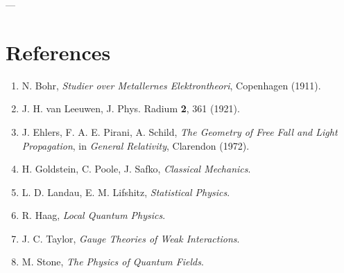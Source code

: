 \documentclass[11pt]{article}
\begin{document}
---

\section*{References}

\begin{enumerate}
\item N. Bohr, \emph{Studier over Metallernes Elektrontheori}, Copenhagen (1911).
\item J. H. van Leeuwen, J. Phys. Radium \textbf{2}, 361 (1921).
\item J. Ehlers, F. A. E. Pirani, A. Schild, \emph{The Geometry of Free Fall and Light Propagation}, in \emph{General Relativity}, Clarendon (1972).
\item H. Goldstein, C. Poole, J. Safko, \emph{Classical Mechanics}.
\item L. D. Landau, E. M. Lifshitz, \emph{Statistical Physics}.
\item R. Haag, \emph{Local Quantum Physics}.
\item J. C. Taylor, \emph{Gauge Theories of Weak Interactions}.
\item M. Stone, \emph{The Physics of Quantum Fields}.
\end{enumerate}
\end{document}
